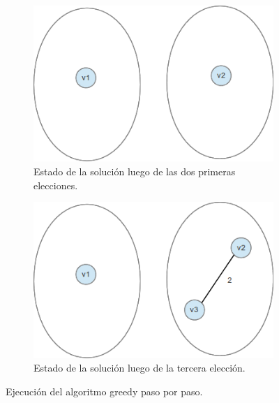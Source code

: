 \begin{figure}[H]
        \centering
        \begin{subfigure}[b]{0.25\textwidth}
                \includegraphics[width=\textwidth]{ej3/greedy_graph_partition_example1.png}
                \caption{Estado de la soluci\'on luego de las dos primeras elecciones.}
                \label{fig:greedy_fig_2}
        \end{subfigure}%
         \qquad
         \qquad
         \qquad
         \qquad
         \qquad
        \begin{subfigure}[b]{0.25\textwidth}
                \includegraphics[width=\textwidth]{ej3/greedy_graph_partition_example2.png}
                \caption{Estado de la soluci\'on luego de la tercera elecci\'on.}
                \label{fig:greedy_fig_3}
        \end{subfigure}
        \caption{Ejecuci\'on del algoritmo greedy paso por paso.}
        \label{greedy_algorith_example1}
\end{figure}

